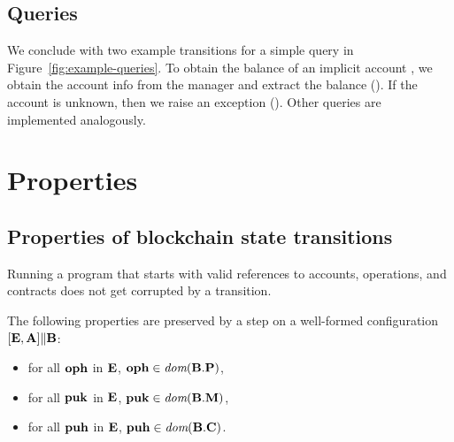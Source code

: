 \documentclass[a4paper]{llncs}
\begin{document}
\subsection{Queries}
\label{sec:queries}


We conclude with two example transitions for a simple query in
Figure~\ref{fig:example-queries}. To obtain the balance of an implicit
account \PUK, we obtain the account info from the manager and extract
the balance (). If the account is
unknown, then we raise an exception
(). Other queries are implemented analogously.

\section{Properties}
\label{sec:properties}

\subsection{Properties of blockchain state transitions}

Running a program that starts with valid references to accounts,
operations, and contracts does not get corrupted by a transition.
\begin{proposition}
  The following properties are preserved by a step on a well-formed
  configuration $ [\textbf{E}, \textbf{A}] \| \textbf{B}$:
  \begin{itemize}
  \item for all $\textbf{oph}$ in $\textbf{E}$, $\textbf{oph} \in \textit{dom} (\textbf{B}.\textbf{P})$,
  \item for all $\textbf{puk}$ in $\textbf{E}$, $\textbf{puk} \in \textit{dom} (\textbf{B}.\textbf{M})$,
  \item for all $\textbf{puh}$ in $\textbf{E}$, $\textbf{puh} \in \textit{dom} (\textbf{B}.\textbf{C})$.
  \end{itemize}
\end{proposition}
\end{document}
